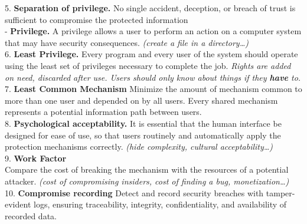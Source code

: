\documentclass[main.tex]{subfiles}
\begin{document}
\noindent \begin{minipage}[t]{0.495\textwidth}
	5. \textbf{Separation of privilege.}	No single accident, deception, or breach of trust is sufficient to compromise the protected information\\
	- \textbf{Privilege.} A privilege allows a user to perform an action on a computer system that may have security consequences. \textit{(create a file in a directory\dots)}\\
	6. \textbf{Least Privilege.} Every program and every user of the system should operate using the least set of privileges necessary to complete the job. \textit{Rights are added on need, discarded after use. Users should only know about things if they \textbf{have} to.}\\
	7. \textbf{Least Common Mechanism} Minimize the amount of mechanism common to more than one user and depended on by all users. Every shared mechanism represents a potential information path between users.\\
	8. \textbf{Psychological acceptability.}
	It is essential that the human interface be designed for ease of use, so that users routinely and automatically apply the protection mechanisms correctly. \textit{(hide complexity, cultural acceptability\dots)}\\
	9. \textbf{Work Factor}\\
	Compare the cost of breaking the mechanism with the resources of a potential attacker. \textit{(cost of compromising insiders, cost of finding a bug, monetization\dots)}\\
	10. \textbf{Compromise recording} Detect and record security breaches with tamper-evident logs, ensuring traceability, integrity, confidentiality, and availability of recorded data.
\end{minipage}
\hline
\end{document}
